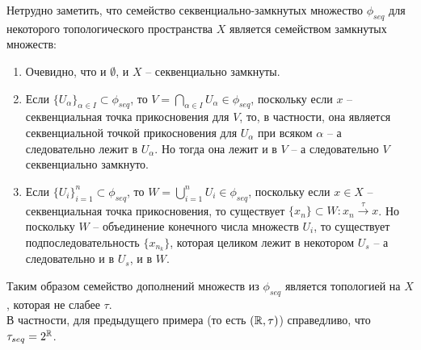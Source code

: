 \begin{note}
    Нетрудно заметить, что семейство секвенциально-замкнутых множество $\phi_{seq}$ для некоторого топологического пространства $X$ является семейством замкнутых множеств:
    \begin{enumerate}
        \item Очевидно, что и $\emptyset$, и $X$ -- секвенциально замкнуты.
        \item Если $\{U_\alpha\}_{\alpha \in I} \subset \phi_{seq}$, то $V = \bigcap_{\alpha \in I} U_\alpha \in \phi_{seq}$, поскольку если $x$ -- секвенциальная точка прикосновения для $V$, то, в частности, она является секвенциальной точкой прикосновения для $U_\alpha$ при всяком $\alpha$ -- а следовательно лежит в $U_\alpha$.
        Но тогда она лежит и в $V$ -- а следовательно $V$ секвенциально замкнуто.
        \item Если $\{U_i\}_{i = 1}^n \subset \phi_{seq}$, то $W = \bigcup_{i = 1}^n U_i \in \phi_{seq}$, поскольку если $x \in X$ -- секвенциальная точка прикосновения, то существует $\{x_n\} \subset W\colon x_n \xrightarrow{\tau} x$.
        Но поскольку $W$ -- объединение конечного числа множеств $U_i$, то существует подпоследовательность $\{x_{n_k}\}$, которая целиком лежит в некотором $U_s$ -- а следовательно и в $U_s$, и в $W$.
    \end{enumerate}
    Таким образом семейство дополнений множеств из $\phi_{seq}$ является топологией на $X$, которая не слабее $\tau$. \\
    В частности, для предыдущего примера (то есть $(\mathbb{R}, \tau)$) справедливо, что $\tau_{seq} = 2^{\mathbb{R}}$.
\end{note}
